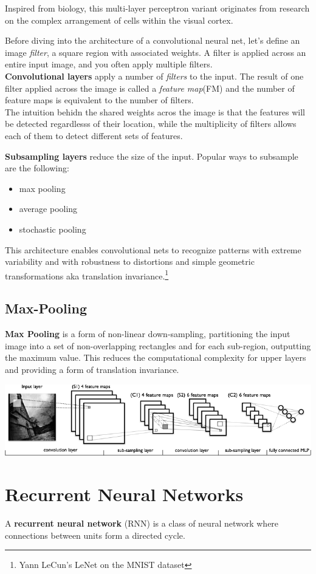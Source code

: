 \documentclass{article}
\begin{document}
\noindent
Inspired from biology, this multi-layer perceptron variant originates from research on the complex arrangement of cells within the visual cortex.

\noindent
Before diving into the architecture of a convolutional neural net, let's define an image \emph{filter}, a square region with associated weights.  A filter is applied across an entire input image, and you often apply multiple filters.  \\

\noindent
\textbf{Convolutional layers} apply a number of \emph{filters} to the input.  The result of one filter applied across the image is called a \emph{feature map}(FM) and the number of feature maps is equivalent to the number of filters. \\

The intuition behidn the shared weights acros the image is that the features will be detected regardlesss of their location, while the multiplicity of filters allows each of them to detect different sets of features.

\noindent
\textbf{Subsampling layers} reduce the size of the input.  Popular ways to subsample are the following:
\begin{itemize}
	\item max pooling
	\item average pooling
	\item stochastic pooling
\end{itemize}


\noindent
This architecture enables convolutional nets to recognize patterns with extreme variability and with robustness to distortions and simple geometric transformations aka translation invariance.\footnote{Yann LeCun's LeNet on the MNIST dataset} \\

\subsection{Max-Pooling}
\textbf{Max Pooling} is a form of non-linear down-sampling, partitioning the input image into a set of non-overlapping rectangles and for each sub-region, outputting the maximum value.  This reduces the computational complexity for upper layers and providing a form of translation invariance.  

\begin{center}
\includegraphics{mylenet.png}
\end{center}

\section{Recurrent Neural Networks}
A \textbf{recurrent neural network} (RNN) is a class of neural network where connections between units form a directed cycle.  
\end{document}
